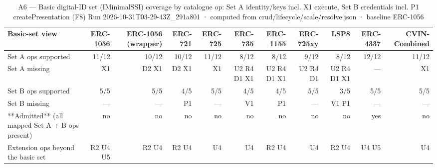 \begin{table}[ht]
\centering
\small
\begin{tabular}{lrrrrrrrrrr}
\toprule
Basic-set view & ERC-1056 & ERC-1056 (wrapper) & ERC-721 & ERC-725 & ERC-735 & ERC-1155 & ERC-725xy & LSP8 & ERC-4337 & CVIN-Combined \\
\midrule
Set A ops supported & 11/12 & 10/12 & 10/12 & 11/12 & 8/12 & 8/12 & 9/12 & 8/12 & 12/12 & 11/12 \\
Set A missing & X1 & D2 X1 & D2 X1 & X1 & U2 R4 D1 X1 & U2 R4 D1 X1 & U2 R4 D1 & U2 R4 D1 X1 & — & X1 \\
Set B ops supported & 5/5 & 5/5 & 4/5 & 5/5 & 4/5 & 4/5 & 5/5 & 3/5 & 5/5 & 5/5 \\
Set B missing & — & — & P1 & — & V1 & P1 & — & V1 P1 & — & — \\
**Admitted** (all mapped Set A + B ops present) & no & no & no & no & no & no & no & no & yes & no \\
Extension ops beyond the basic set & R2 U4 U5 & R2 U4 & R2 U4 & U4 & U4 & R2 U4 & U4 & R2 U4 & U4 U5 & U4 \\
\bottomrule
\end{tabular}
\caption{A6 — Basic digital-ID set (IMinimalSSI) coverage by catalogue op: Set A identity/keys incl. X1 execute, Set B credentials incl. P1 createPresentation (F8) Run 2026-10-31T03-29-43Z\_291a801 · computed from crud/lifecycle/scale/resolve.json · baseline ERC-1056}
\label{tab:analysis_basic_set}
\end{table}
